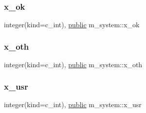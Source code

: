 \mbox{\label{namespacem__system_a1026112f5dba28c9a8b8393524c2682f}} 
\subsubsection{\texorpdfstring{x\+\_\+ok}{x\_ok}}
{\footnotesize\ttfamily integer(kind=c\+\_\+int), \hyperlink{M__stopwatch_83_8txt_a2f74811300c361e53b430611a7d1769f}{public} m\+\_\+system\+::x\+\_\+ok}

\mbox{\label{namespacem__system_ac931698ef74075c45e8b1e33f9302d3e}} 
\subsubsection{\texorpdfstring{x\+\_\+oth}{x\_oth}}
{\footnotesize\ttfamily integer(kind=c\+\_\+int), \hyperlink{M__stopwatch_83_8txt_a2f74811300c361e53b430611a7d1769f}{public} m\+\_\+system\+::x\+\_\+oth}

\mbox{\label{namespacem__system_a0674408245cc1bdfd6fcfdbe179e63f5}} 
\subsubsection{\texorpdfstring{x\+\_\+usr}{x\_usr}}
{\footnotesize\ttfamily integer(kind=c\+\_\+int), \hyperlink{M__stopwatch_83_8txt_a2f74811300c361e53b430611a7d1769f}{public} m\+\_\+system\+::x\+\_\+usr}

